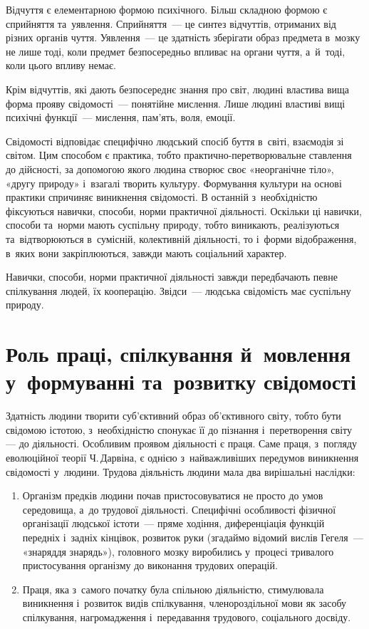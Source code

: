 \documentclass[a5paper,oneside,DIV=12,12pt,headings=small]{scrartcl}
\begin{document}
		Відчуття є елементарною формою психічного. Більш складною формою є сприйняття та~уявлення. Сприйняття~— це синтез відчуттів, отриманих від різних органів чуття. Уявлення~— це здатність зберігати образ предмета в~мозку не лише тоді, коли предмет безпосередньо впливає на органи чуття, а~й~тоді, коли цього впливу немає.

		Крім відчуттів, які дають безпосереднє знання про світ, людині властива вища форма прояву свідомості~— понятійне мислення. Лише людині властиві вищі психічні функції~— мислення, пам'\-ять, воля, емоції.

		Свідомості відповідає специфічно людський спосіб буття в~світі, взаємодія зі світом. Цим способом є практика, тобто практично-перетворювальне ставлення до дійсності, за допомогою якого людина створює своє «неорганічне тіло», «другу природу» і~взагалі творить культуру. Формування культури на основі практики спричиняє виникнення свідомості. В останній з~необхідністю фіксуються навички, способи, норми практичної діяльності. Оскільки ці навички, способи та~норми мають суспільну природу, тобто виникають, реалізуються та~відтворюються в~сумісній, колективній діяльності, то і~форми відображення, в~яких вони закріплюються, завжди мають соціальний характер.

		Навички, способи, норми практичної діяльності завжди передбачають певне спілкування людей, їх кооперацію. Звідси~— людська свідомість має суспільну природу.

	\section{Роль праці, спілкування й~мовлення у~формуванні та~розвитку свідомості}
		Здатність людини творити суб'\-єк\-тив\-ний образ об'\-єк\-тив\-но\-го світу, тобто бути свідомою істотою, з~необхідністю спонукає її до пізнання і~перетворення світу — до діяльності. Особливим проявом діяльності є праця. Саме праця, з~погляду еволюційної теорії Ч.\,Дарвіна, є однією з~найважливіших передумов виникнення свідомості у~людини. Трудова діяльність людини мала два вирішальні наслідки:
		\begin{enumerate}
			\item Організм предків людини почав пристосовуватися не просто до умов середовища, а~до трудової діяльності. Специфічні особливості фізичної організації людської істоти~— пряме ходіння, диференціація функцій передніх і~задніх кінцівок, розвиток руки (згадаймо відомий вислів Гегеля~— «знаряддя знарядь»), головного мозку виробились у~процесі тривалого пристосування організму до виконання трудових операцій.
			\item Праця, яка з~самого початку була спільною діяльністю, стимулювала виникнення і~розвиток видів спілкування, членороздільної мови як засобу спілкування, нагромадження і~передавання трудового, соціального досвіду.
		\end{enumerate}
\end{document}

